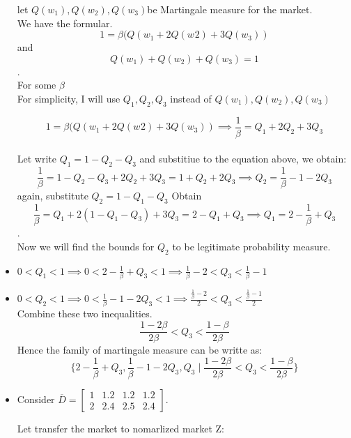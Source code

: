 \documentclass[12pt]{article}
\newcommand{\ol}{\overline}
\begin{document}
\begin{itemize}
    let $Q(w_{1}), Q(w_{2}), Q(w_{3})$be Martingale measure for the market.\\
    We have the formular.\\
    
    $$1 = \beta(Q(w_{1}+2Q(w_{}{2})+3Q(w_{3}))$$ and\\ 
 



$$Q(w_{1}) +  Q(w_{2})+ Q(w_{3}) = 1$$. \\ 
For some $\beta$\\
For simplicity, I will use $Q_{1}, Q_{2}, Q_{3}$ instead of $Q(w_{1}), Q(w_{2}), Q(w_{3})$

$$1 = \beta(Q(w_{1}+2Q(w_{}{2})+3Q(w_{3})) \implies \frac{1}{\beta} = Q_{1} + 2 Q_{2} +3 Q_{3}$$\\
Let write $Q_{1} = 1-Q_{2}-Q_{3}$ and substitiue to the equation above, we obtain:\\
$$\frac{1}{\beta} = 1-Q_{2}-Q_{3} + 2 Q_{2} +3 Q_{3} = 1+Q_{2}+2Q_{3} \implies Q_{2} =\frac{1}{\beta} - 1 - 2Q_{3} $$
again, substitute $Q_{2} = 1-Q_{1}-Q_{3}$ Obtain\\
$$\frac{1}{\beta} = Q_{1} + 2(1-Q_{1}-Q_{3}) +3 Q_{3}  = 2-Q_{1}+Q_{3} \implies Q_{1} = 2-\frac{1}{\beta}+Q_{3}$$.\\ Now we will find the bounds for $Q_{2}$ to be legitimate probability measure.

\item $0<Q_{1}<1 \implies 0<2-\frac{1}{\beta}+Q_{3}<1 \implies \frac{1}{\beta} -2 < Q_{3} < \frac{1}{\beta} - 1$
\item $0<Q_{2}<1 \implies 0<\frac{1}{\beta} - 1 - 2Q_{3} <1 \implies \frac{\frac{1}{\beta} - 2}{2} < Q_{3}<\frac{\frac{1}{\beta}-1}{2}$\\
Combine these two inequalities.\\ 
$$\frac{1-2\beta}{2\beta} < Q_{3}<\frac{1-\beta}{2\beta}$$
Hence the family of martingale measure can be writte as:\\
$$\{2-\frac{1}{\beta}+Q_{3},\frac{1}{\beta} - 1 - 2Q_{3} ,Q_{3} \mid \frac{1-2\beta}{2\beta} < Q_{3}<\frac{1-\beta}{2\beta} \}$$


\item Consider $\ol{D}=
    \left[\begin{array}{llll}
    1 & 1.2 & 1.2 & 1.2 \\
    2 & 2.4 & 2.5 & 2.4
    \end{array}
    \right]$.
   
  Let transfer the market to nomarlized market Z:
  

\end{itemize}
\end{document}
